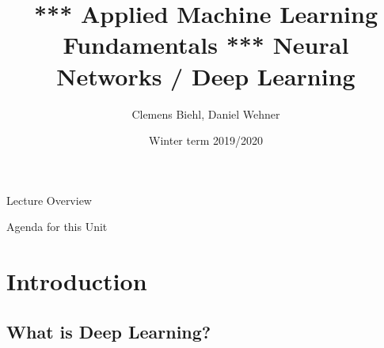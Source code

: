 


\title[Deep Learning]{*** Applied Machine Learning Fundamentals *** Neural Networks / Deep Learning}
\author{Clemens Biehl, Daniel Wehner}
\date{Winter term 2019/2020}




\maketitlepage


\begin{frame}{Lecture Overview}{}
\end{frame}


\begin{frame}{Agenda for this Unit}
	\begin{multicols}{2}
		\tableofcontents
	\end{multicols}
\end{frame}


\section{Introduction}

\subsection{What is Deep Learning?}

